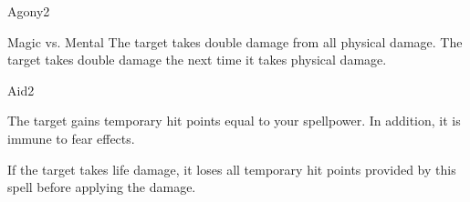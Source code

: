 \begin{spellsection}{Agony}{2}
    \begin{spellheader}
    \end{spellheader}
    \begin{spellcontent}
        \begin{spelltargetinginfo}
        \end{spelltargetinginfo}
        \begin{spelleffects}
            \begin{spellattack}{Magic vs. Mental}
                \spellsuccess The target takes double damage from all physical damage.
                \spellfailure The target takes double damage the next time it takes physical damage.
            \end{spellattack}
            \spelldur \durshort
        \end{spelleffects}
    \end{spellcontent}
    \begin{spellfooter}
        \miscastrandom
    \end{spellfooter}
\end{spellsection}

\begin{spellsection}{Aid}{2}
    \begin{spellheader}
    \end{spellheader}
    \begin{spellcontent}
        \begin{spelltargetinginfo}
        \end{spelltargetinginfo}
        \begin{spelleffects}
            \spelleffect The target gains temporary hit points equal to your spellpower. In addition, it is immune to fear effects.
            \spelldur \durpersonallong
        \end{spelleffects}
    \end{spellcontent}
    \begin{spellfooter}
        \spellnotes If the target takes life damage, it loses all temporary hit points provided by this spell before applying the damage.
        \miscastexplode
    \end{spellfooter}
\end{spellsection}

